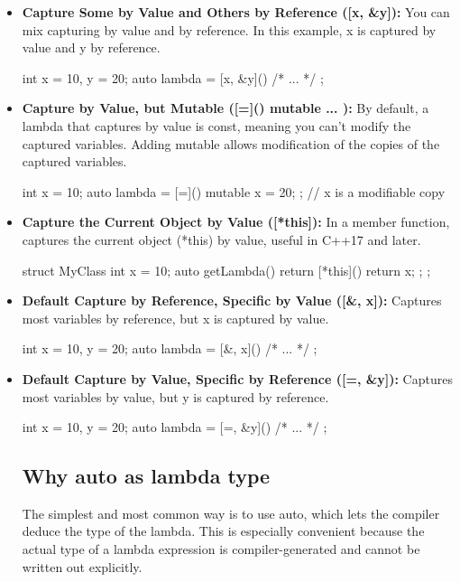\documentclass{report}
\begin{document}
\begin{itemize}
        \item \textbf{Capture Some by Value and Others by Reference ([x, \&y]):} You can mix capturing by value and by reference. In this example, x is captured by value and y by reference.
            \smallbreak \noindent
            \begin{cppcode}
                int x = 10, y = 20;
                auto lambda = [x, &y]() { /* ... */ };
            \end{cppcode}
        \item \textbf{Capture by Value, but Mutable ([=]() mutable { ... }):} By default, a lambda that captures by value is const, meaning you can't modify the captured variables. Adding mutable allows modification of the copies of the captured variables.
            \smallbreak \noindent
            \begin{cppcode}
                int x = 10;
                auto lambda = [=]() mutable { x = 20; }; // x is a modifiable copy
            \end{cppcode}
        \item \textbf{Capture the Current Object by Value ([*this]):} In a member function, captures the current object (*this) by value, useful in C++17 and later.
            \smallbreak \noindent
            \begin{cppcode}
                struct MyClass {
                int x = 10;
                auto getLambda() { return [*this]() { return x; }; }
            };
            \end{cppcode}
        \item \textbf{Default Capture by Reference, Specific by Value ([\&, x]):} Captures most variables by reference, but x is captured by value.
            \smallbreak \noindent
            \begin{cppcode}
                int x = 10, y = 20;
                auto lambda = [&, x]() { /* ... */ };
            \end{cppcode}
        \item \textbf{Default Capture by Value, Specific by Reference ([=, \&y]):} Captures most variables by value, but y is captured by reference.
            \smallbreak \noindent
            \begin{cppcode}
                int x = 10, y = 20;
                auto lambda = [=, &y]() { /* ... */ };
            \end{cppcode}

        \bigbreak \noindent 
        \subsection{Why auto as lambda type}
        \bigbreak \noindent 
        \begin{concept}
            The simplest and most common way is to use auto, which lets the compiler deduce the type of the lambda. This is especially convenient because the actual type of a lambda expression is compiler-generated and cannot be written out explicitly.
        \end{concept}
        
    \end{itemize}
\end{document}
